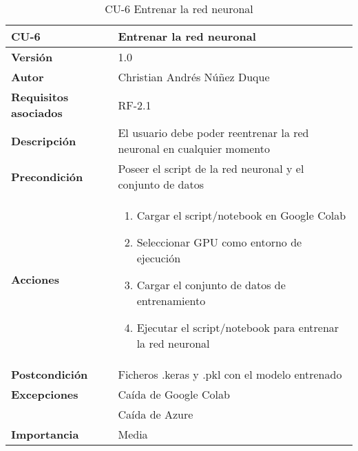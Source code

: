 \begin{table}[p]
	\centering
	\begin{tabularx}{\linewidth}{ p{} p{} }
		\toprule
		\textbf{CU-6}    & \textbf{Entrenar la red neuronal}\\
		\toprule
		\textbf{Versión}              & 1.0    \\
		\textbf{Autor}                & Christian Andrés Núñez Duque \\
		\textbf{Requisitos asociados} & RF-2.1 \\
		\textbf{Descripción}          & El usuario debe poder reentrenar la red neuronal en cualquier momento \\
		\textbf{Precondición}         & Poseer el script de la red neuronal y el conjunto de datos \\
		\textbf{Acciones}             &
		\begin{enumerate}
			\def\labelenumi{\arabic{enumi}.}
			\tightlist
			\item Cargar el script/notebook en Google Colab
			\item Seleccionar GPU como entorno de ejecución
			\item Cargar el conjunto de datos de entrenamiento
			\item Ejecutar el script/notebook para entrenar la red neuronal
		\end{enumerate}\\
		\textbf{Postcondición}        & Ficheros .keras y .pkl con el modelo entrenado \\
		\textbf{Excepciones}          & Caída de Google Colab \\ & Caída de Azure \\
		\textbf{Importancia}          & Media \\
		\bottomrule
	\end{tabularx}
	\caption{CU-6 Entrenar la red neuronal}
\end{table}

